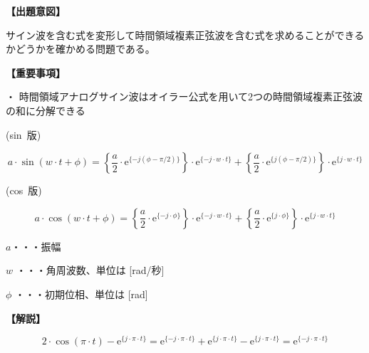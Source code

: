 \noindent \textbf{【出題意図】}

\bigskip
\noindent サイン波を含む式を変形して時間領域複素正弦波を含む式を求めることができるかどうかを確かめる問題である。

\vspace{1em}
\noindent \textbf{【重要事項】}

\medskip
\noindent ・ 時間領域アナログサイン波はオイラー公式を用いて2つの時間領域複素正弦波の和に分解できる

\medskip
\noindent \mbox{(sin 版)}

\[
a \cdot \sin ( w \cdot t + \phi )
=  \left \{ \frac{a}{2} \cdot \textrm{e}^{\{-j (\phi-\pi/2) \}} \right \} \cdot \textrm{e}^{\{-j \cdot w \cdot t \}}
+  \left \{ \frac{a}{2} \cdot \textrm{e}^{\{j (\phi-\pi/2) \}} \right \} \cdot \textrm{e}^{\{j \cdot w \cdot t \}}
\]

\medskip
\noindent \mbox{(cos 版)}

\[
a \cdot \cos ( w \cdot t + \phi )
=  \left \{ \frac{a}{2} \cdot \textrm{e}^{\{-j \cdot \phi \}} \right \} \cdot \textrm{e}^{\{-j \cdot w \cdot t \}}
+  \left \{ \frac{a}{2} \cdot \textrm{e}^{\{j  \cdot \phi \}} \right \} \cdot \textrm{e}^{\{j \cdot w \cdot t \}}
\]

\bigskip
\noindent  $a$・・・振幅

\bigskip
\noindent $w$ ・・・角周波数、単位は [rad/秒]

\bigskip
\noindent $\phi$ ・・・初期位相、単位は [rad]

\bigskip

\vspace{1em}
\noindent \textbf{【解説】}

\bigskip

\[
2 \cdot \cos (\pi \cdot t) - \textrm{e}^{\{j \cdot \pi \cdot t \}}
=
\textrm{e}^{\{-j \cdot \pi \cdot t \}} + \textrm{e}^{\{j \cdot \pi \cdot t \}} - \textrm{e}^{\{j \cdot \pi \cdot t \}}
=
\textrm{e}^{\{-j \cdot \pi \cdot t \}}
\]
